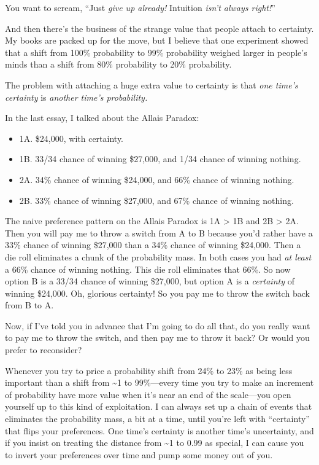 {
 You want to scream, ``Just \textit{give up
already!} Intuition \textit{isn't always
right!}''}

{
 And then there's the business of the strange value
that people attach to certainty. My books are packed up for the move,
but I believe that one experiment showed that a shift from 100\%
probability to 99\% probability weighed larger in
people's minds than a shift from 80\% probability to
20\% probability.}

{
 The problem with attaching a huge extra value to certainty is that
\textit{one time's certainty} is \textit{another
time's probability.}}

{
 In the last essay, I talked about the Allais Paradox:}

\begin{itemize}
\item {
 1A. \$24,000, with certainty.}

\item {
 1B. 33/34 chance of winning \$27,000, and 1/34 chance of winning
nothing.}

\item {
 2A. 34\% chance of winning \$24,000, and 66\% chance of winning
nothing.}

\item {
 2B. 33\% chance of winning \$27,000, and 67\% chance of winning
 nothing.}
\end{itemize}

{
 The naive preference pattern on the Allais Paradox is 1A
{\textgreater} 1B and 2B {\textgreater} 2A. Then you will pay me to
throw a switch from A to B because you'd rather have a
33\% chance of winning \$27,000 than a 34\% chance of winning \$24,000.
Then a die roll eliminates a chunk of the probability mass. In both
cases you had \textit{at least} a 66\% chance of winning nothing. This
die roll eliminates that 66\%. So now option B is a 33/34 chance of
winning \$27,000, but option A is a \textit{certainty} of winning
\$24,000. Oh, glorious certainty! So you pay me to throw the switch
back from B to A.}

{
 Now, if I've told you in advance that
I'm going to do all that, do you really want to pay me
to throw the switch, and then pay me to throw it back? Or would you
prefer to reconsider?}

{
 Whenever you try to price a probability shift from 24\% to 23\% as
being less important than a shift from \~{}1 to 99\%---every time you
try to make an increment of probability have more value when
it's near an end of the scale---you open yourself up to
this kind of exploitation. I can always set up a chain of events that
eliminates the probability mass, a bit at a time, until
you're left with
``certainty'' that flips your
preferences. One time's certainty is another
time's uncertainty, and if you insist on treating the
distance from \~{}1 to 0.99 as special, I can cause you to invert your
preferences over time and pump some money out of you.}

